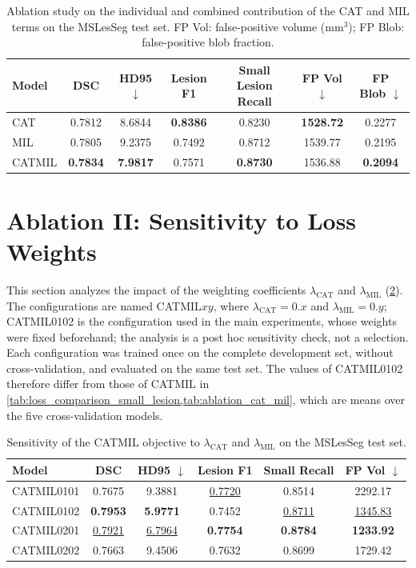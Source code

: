 \begin{table}[H]
\centering
\caption{Ablation study on the individual and combined contribution of the
CAT and MIL terms on the MSLesSeg test set. FP Vol: false-positive volume
(mm$^3$); FP Blob: false-positive blob fraction.}
\label{tab:ablation_cat_mil}
\begin{tabular}{lcccccc}
\toprule
Model & DSC & HD95 $\downarrow$ & Lesion F1 & Small Lesion Recall & FP Vol $\downarrow$ & FP Blob $\downarrow$ \\
\midrule
CAT    & 0.7812 & 8.6844 & \textbf{0.8386} & 0.8230 & \textbf{1528.72} & 0.2277 \\
MIL    & 0.7805 & 9.2375 & 0.7492 & 0.8712 & 1539.77 & 0.2195 \\
CATMIL & \textbf{0.7834} & \textbf{7.9817} & 0.7571 & \textbf{0.8730} & 1536.88 & \textbf{0.2094} \\
\bottomrule
\end{tabular}
\end{table}

\section{Ablation II: Sensitivity to Loss Weights}
\label{appendix:catmil-loss-weights}

This section analyzes the impact of the weighting coefficients
$\lambda_{\text{CAT}}$ and $\lambda_{\text{MIL}}$ (\cref{tab:ablation_lambda}). The configurations are
named CATMIL$xy$, where $\lambda_{\text{CAT}}=0.x$ and
$\lambda_{\text{MIL}}=0.y$; CATMIL0102 is the configuration used in the
main experiments, whose weights were fixed beforehand; the analysis is a
post hoc sensitivity check, not a selection. Each configuration was trained
once on the complete development set, without cross-validation, and
evaluated on the same test set. The values of CATMIL0102 therefore differ from those of
CATMIL in \cref{tab:loss_comparison_small_lesion,tab:ablation_cat_mil},
which are means over the five cross-validation models.

\begin{table}[H]
\centering
\caption{Sensitivity of the CATMIL objective to $\lambda_{\text{CAT}}$ and
$\lambda_{\text{MIL}}$ on the MSLesSeg test set.}
\label{tab:ablation_lambda}
\begin{tabular}{lccccc}
\toprule
Model & DSC & HD95 $\downarrow$ & Lesion F1 & Small Recall & FP Vol $\downarrow$ \\
\midrule
CATMIL0101 & 0.7675 & 9.3881 & \underline{0.7720} & 0.8514 & 2292.17 \\
CATMIL0102 & \textbf{0.7953} & \textbf{5.9771} & 0.7452 & \underline{0.8711} & \underline{1345.83} \\
CATMIL0201 & \underline{0.7921} & \underline{6.7964} & \textbf{0.7754} & \textbf{0.8784} & \textbf{1233.92} \\
CATMIL0202 & 0.7663 & 9.4506 & 0.7632 & 0.8699 & 1729.42 \\
\bottomrule
\end{tabular}
\end{table}


